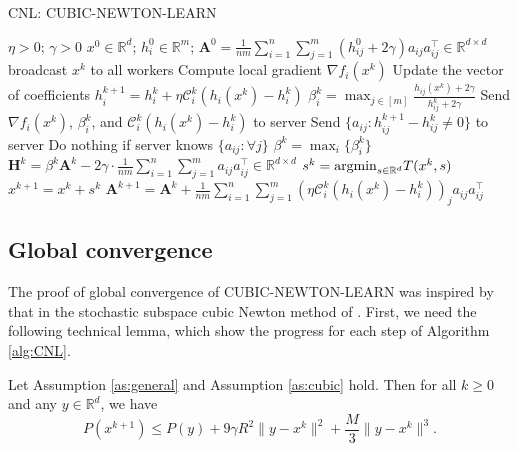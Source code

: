 \documentclass[12pt]{article}
\newcommand{\R}{\mathbb{R}}
\newcommand{\newalpha}{h}
\newcommand{\mA}{\mathbf{A}}
\newcommand{\mH}{\mathbf{H}}
\newcommand{\cC}{{\mathcal{C}}}
\begin{document}
\begin{algorithm}[tb]
	\caption{{\sf CNL: CUBIC-NEWTON-LEARN}}
	\label{alg:CNL}
	\begin{algorithmic}
		 $\eta>0$; $\gamma>0$
		$x^0 \in \R^d$; $h^0_i \in \R^{m}$; $\mA^0 = \frac{1}{nm} \sum \limits_{i=1}^n  \sum\limits_{j=1}^{m} (h_{ij}^0 + 2\gamma)a_{ij}a_{ij}^\top \in \R^{d\times d}$
		\STATE broadcast $x^k$ to all workers 
		\STATE Compute local gradient $\nabla f_i(x^k)$ 
		\STATE Update the vector of coefficients $h^{k+1}_i = h^k_i + \eta \cC_i^k(\newalpha_i(x^k) - h^k_i)$ 
		\STATE $\beta_i^k = \max_{j\in [m]} \frac{\newalpha_{ij}(x^k) + 2\gamma}{h_{ij}^k + 2\gamma}$
		\STATE Send $\nabla f_i(x^k)$, $\beta_i^k$, and $\cC_i^k(\newalpha_i(x^k) - h^k_i)$ to server 
		 Send $\{a_{ij} : h_{ij}^{k+1} - h_{ij}^k \neq 0\}$ to server
		 Do nothing if server knows $\{a_{ij} : \forall j\}$
		\ENDFOR
		\STATE $\beta^k = \max_{i} \{  \beta_i^k  \}$
		\STATE $\mH^k = \beta^k \mA^k - 2\gamma \cdot \frac{1}{nm} \sum\limits_{i=1}^n  \sum\limits_{j=1}^{m}a_{ij}a_{ij}^\top \in \R^{d\times d}$
		\STATE $s^k = {\rm argmin}_{s\in \R^d} T(x^k, s)$
		\STATE $x^{k+1} = x^k + s^k$
		\STATE $\mA^{k+1} = \mA^k + \frac{1}{nm} \sum \limits_{i=1}^n \sum\limits_{j=1}^{m} (\eta \cC_i^k(\newalpha_i(x^k) - h^k_i))_j a_{ij}a_{ij}^\top $
		\ENDFOR
	\end{algorithmic}
\end{algorithm} 






\subsection{Global convergence}

The proof of global convergence of {\sf CUBIC-NEWTON-LEARN} was inspired by that in the stochastic subspace cubic Newton method of \citet{hanzely2020stochastic}. First, we need the following technical lemma, which show the progress for each step of Algorithm \ref{alg:CNL}. 

\begin{lemma}\label{lm:global}
	Let Assumption \ref{as:general} and Assumption \ref{as:cubic} hold. Then for all $k\geq 0$ and any $y \in \R^d$, we have 
	$$
	P(x^{k+1}) \leq P(y) + 9\gamma R^2 \|y-x^k\|^2 + \frac{M}{3}\|y-x^k\|^3. 
	$$
\end{lemma}
\end{document}
